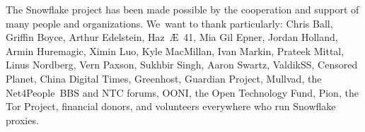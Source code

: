 \documentclass[letterpaper,twocolumn]{article}
\begin{document}
The Snowflake project has been made possible
by the cooperation and support of many people
and organizations.
We~want to thank particularly:
Chris Ball, %
Griffin Boyce, %
Arthur Edelstein, %
Haz~Æ~41, %
Mia Gil Epner, %
Jordan Holland, %
Armin Huremagic, %
Ximin Luo, %
Kyle MacMillan, %
Ivan Markin, %
Prateek Mittal, %
Linus Nordberg, %
Vern Paxson, %
Sukhbir Singh, %
Aaron Swartz,
ValdikSS, %
Censored Planet, %
China Digital Times,
Greenhost, %
Guardian Project, %
Mullvad, %
the Net4People~BBS and NTC forums, %
OONI, %
the Open Technology Fund, %
Pion,
the Tor Project,
financial donors,
and volunteers everywhere who run Snowflake proxies.

{
\raggedright


}
\end{document}
